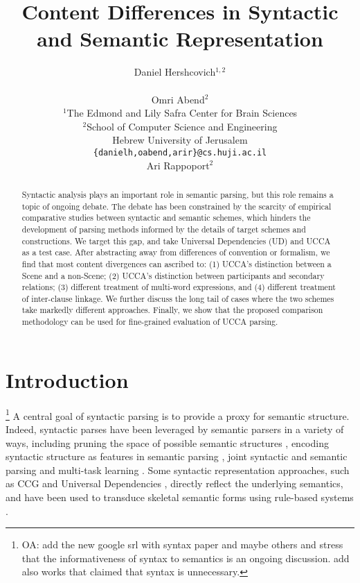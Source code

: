 \documentclass[11pt,a4paper]{article}
\title{Content Differences in Syntactic and Semantic Representation}
\author{Daniel Hershcovich$^{1,2}$ \\
  \\\And
  Omri Abend$^2$ \\
  $^1$The Edmond and Lily Safra Center for Brain Sciences \\
  $^2$School of Computer Science and Engineering \\
  Hebrew University of Jerusalem \\
  \texttt{\{danielh,oabend,arir\}@cs.huji.ac.il}
  \\\And
  Ari Rappoport$^2$
}
\date{}
\newcommand{\oa}[1]{\footnote{\color{red}OA: #1}}
\begin{document}
\maketitle

\begin{abstract}

  Syntactic analysis plays an important role in semantic parsing,
  but this role remains a topic of ongoing debate.
  The debate has been constrained by the scarcity of empirical comparative studies between syntactic and semantic schemes,
  which hinders the development of parsing methods informed by the details of target schemes and constructions.
  We target this gap, and take Universal Dependencies (UD) and UCCA as a test case.
  After abstracting away from differences of convention or formalism,
  we find that most content divergences can ascribed to: 
  (1) UCCA's distinction between a Scene and a non-Scene; %
  (2) UCCA's distinction between participants and secondary relations; %
  (3) different treatment of multi-word expressions, and
  (4) different treatment of inter-clause linkage.
  We further discuss the long tail of cases where the two schemes take markedly
  different approaches.
  Finally, we show that the proposed comparison methodology can be used
  for fine-grained evaluation of UCCA parsing.
\end{abstract}


\section{Introduction}\label{sec:introduction}

  \oa{add the new google srl with syntax paper and maybe others and stress that the informativeness
  of syntax to semantics is an ongoing discussion. add also works that claimed that syntax is unnecessary.}
  A central goal of syntactic parsing is to provide a proxy for semantic structure.
  Indeed, syntactic parses have been leveraged by semantic parsers in a variety of ways,
  including pruning the space of possible semantic structures \cite{xue2004calibrating}, 
  encoding syntactic structure as features in semantic parsing \cite{gildea2002automatic}, 
  joint syntactic and semantic parsing \cite{surdeanu2008conll,hajivc2009conll} and
  multi-task learning \cite{swayamdipta2018syntactic}. 
  Some syntactic representation approaches, such as CCG \cite{Steedman:00} and Universal Dependencies \cite[UD; ][]{nivre2016universal},
  directly reflect the underlying semantics, and have been used to
  transduce skeletal semantic forms using rule-based systems \cite{Basile:12,white2016universal,reddy2017universal}.
  
\end{document}
